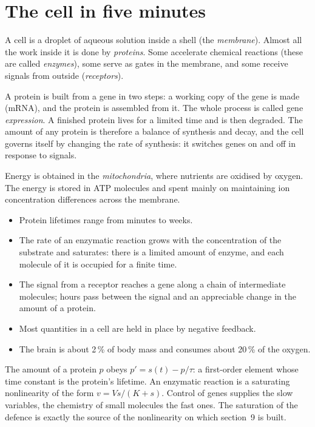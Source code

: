 \section{The cell in five minutes}
A cell is a droplet of aqueous solution inside a shell (the \emph{membrane}). Almost all the work inside it is done by \emph{proteins}. Some accelerate chemical reactions (these are called \emph{enzymes}), some serve as gates in the membrane, and some receive signals from outside (\emph{receptors}).

A protein is built from a gene in two steps: a working copy of the gene is made (mRNA), and the protein is assembled from it. The whole process is called gene \emph{expression}. A finished protein lives for a limited time and is then degraded. The amount of any protein is therefore a balance of synthesis and decay, and the cell governs itself by changing the rate of synthesis: it switches genes on and off in response to signals.

Energy is obtained in the \emph{mitochondria}, where nutrients are oxidised by oxygen. The energy is stored in ATP molecules and spent mainly on maintaining ion concentration differences across the membrane.
\facts
\begin{itemize}
\item Protein lifetimes range from minutes to weeks.\tU
\item The rate of an enzymatic reaction grows with the concentration of the substrate and saturates: there is a limited amount of enzyme, and each molecule of it is occupied for a finite time.\tU
\item The signal from a receptor reaches a gene along a chain of intermediate molecules; hours pass between the signal and an appreciable change in the amount of a protein.\tU
\item Most quantities in a cell are held in place by negative feedback.\tU
\item The brain is about 2\,\% of body mass and consumes about 20\,\% of the oxygen.\tU
\end{itemize}
\begin{ineq}
The amount of a protein $p$ obeys $p' = s(t) - p/\tau$: a first-order element whose time constant is the protein's lifetime. An enzymatic reaction is a saturating nonlinearity of the form $v = V s/(K + s)$. Control of genes supplies the slow variables, the chemistry of small molecules the fast ones. The saturation of the defence is exactly the source of the nonlinearity on which section~9 is built.
\end{ineq}
